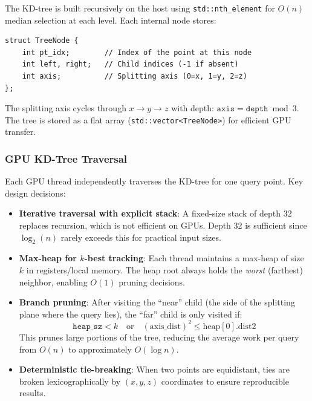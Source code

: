 \documentclass[11pt,a4paper]{article}
\begin{document}
The KD-tree is built recursively on the host using \texttt{std::nth\_element} for $O(n)$ median selection at each level. Each internal node stores:

\begin{lstlisting}[caption={KD-tree node structure}]
struct TreeNode {
    int pt_idx;        // Index of the point at this node
    int left, right;   // Child indices (-1 if absent)
    int axis;          // Splitting axis (0=x, 1=y, 2=z)
};
\end{lstlisting}

The splitting axis cycles through $x \to y \to z$ with depth: $\texttt{axis} = \texttt{depth} \bmod 3$. The tree is stored as a flat array (\texttt{std::vector<TreeNode>}) for efficient GPU transfer.

\subsubsection{GPU KD-Tree Traversal}

Each GPU thread independently traverses the KD-tree for one query point. Key design decisions:

\begin{itemize}
    \item \textbf{Iterative traversal with explicit stack}: A fixed-size stack of depth 32 replaces recursion, which is not efficient on GPUs. Depth 32 is sufficient since $\log_2(n)$ rarely exceeds this for practical input sizes.

    \item \textbf{Max-heap for $k$-best tracking}: Each thread maintains a max-heap of size $k$ in registers/local memory. The heap root always holds the \textit{worst} (farthest) neighbor, enabling $O(1)$ pruning decisions.

    \item \textbf{Branch pruning}: After visiting the ``near'' child (the side of the splitting plane where the query lies), the ``far'' child is only visited if:
    \[
        \texttt{heap\_sz} < k \quad \text{or} \quad (\text{axis\_dist})^2 \leq \text{heap}[0].\text{dist2}
    \]
    This prunes large portions of the tree, reducing the average work per query from $O(n)$ to approximately $O(\log n)$.

    \item \textbf{Deterministic tie-breaking}: When two points are equidistant, ties are broken lexicographically by $(x, y, z)$ coordinates to ensure reproducible results.
\end{itemize}
\end{document}
